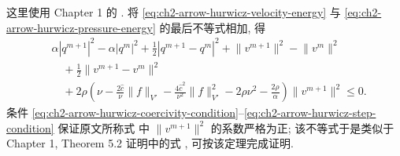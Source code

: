 \begin{Proof}
\begin{equation}
\end{equation}
这里使用 Chapter 1 的 . 将 \eqref{eq:ch2-arrow-hurwicz-velocity-energy} 与 \eqref{eq:ch2-arrow-hurwicz-pressure-energy} 的最后不等式相加, 得
\begin{equation}
\begin{aligned}
&\alpha|q^{m+1}|^2-\alpha|q^m|^2
+\frac12|q^{m+1}-q^m|^2
+\lVert v^{m+1}\rVert^2-\lVert v^m\rVert^2\\
&\quad+\frac12\lVert v^{m+1}-v^m\rVert^2\\
&\quad+2\rho\left(\nu-\frac{2\widehat c}\nu\lVert f\rVert_{V'}
-\frac{4\widehat c^2}{\nu^2}\lVert f\rVert_{V'}^2
-2\rho\nu^2-\frac{2\rho}\alpha\right)
\lVert v^{m+1}\rVert^2\leq0.
\end{aligned}
\label{eq:ch2-arrow-hurwicz-combined-energy}
\end{equation}
条件 \eqref{eq:ch2-arrow-hurwicz-coercivity-condition}--\eqref{eq:ch2-arrow-hurwicz-step-condition} 保证原文所称式  中 $\lVert v^{m+1}\rVert^2$ 的系数严格为正; 该不等式于是类似于 Chapter 1, Theorem 5.2 证明中的式 , 可按该定理完成证明.
\end{Proof}
